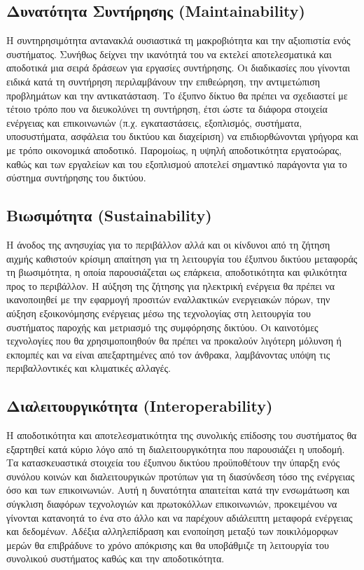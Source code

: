 \documentclass[12pt, a4paper, oneside]{report}
\begin{document}
\subsection*{Δυνατότητα Συντήρησης (Maintainability)}

Η συντηρησιμότητα αντανακλά ουσιαστικά τη μακροβιότητα και την αξιοπιστία ενός συστήματος. Συνήθως δείχνει την ικανότητά του να εκτελεί αποτελεσματικά και αποδοτικά μια σειρά δράσεων για εργασίες συντήρησης. Οι διαδικασίες που γίνονται ειδικά κατά τη συντήρηση περιλαμβάνουν την επιθεώρηση, την αντιμετώπιση προβλημάτων και την αντικατάσταση. Το έξυπνο δίκτυο θα πρέπει να σχεδιαστεί με τέτοιο τρόπο που να διευκολύνει τη συντήρηση, έτσι ώστε τα διάφορα στοιχεία ενέργειας και επικοινωνιών (π.χ. εγκαταστάσεις, εξοπλισμός, συστήματα, υποσυστήματα, ασφάλεια του δικτύου και διαχείριση) να επιδιορθώνονται γρήγορα και με τρόπο οικονομικά αποδοτικό. Παρομοίως, η υψηλή αποδοτικότητα εργατοώρας, καθώς και των εργαλείων και του εξοπλισμού αποτελεί σημαντικό παράγοντα για το σύστημα συντήρησης του δικτύου.

\subsection*{Βιωσιμότητα (Sustainability)}

Η άνοδος της ανησυχίας για το περιβάλλον αλλά και οι κίνδυνοι από τη ζήτηση αιχμής καθιστούν κρίσιμη απαίτηση για τη λειτουργία του έξυπνου δικτύου μεταφοράς τη βιωσιμότητα, η οποία παρουσιάζεται ως επάρκεια, αποδοτικότητα και φιλικότητα προς το περιβάλλον. Η αύξηση της ζήτησης για ηλεκτρική ενέργεια θα πρέπει να ικανοποιηθεί με την εφαρμογή προσιτών εναλλακτικών ενεργειακών πόρων, την αύξηση εξοικονόμησης ενέργειας μέσω της τεχνολογίας στη λειτουργία του συστήματος παροχής και μετριασμό της συμφόρησης δικτύου. Οι καινοτόμες τεχνολογίες που θα χρησιμοποιηθούν θα πρέπει να προκαλούν λιγότερη μόλυνση ή εκπομπές και να είναι απεξαρτημένες από τον άνθρακα, λαμβάνοντας υπόψη τις περιβαλλοντικές και κλιματικές αλλαγές.

\subsection*{Διαλειτουργικότητα (Interoperability)}

Η αποδοτικότητα και αποτελεσματικότητα της συνολικής επίδοσης του συστήματος θα εξαρτηθεί κατά κύριο λόγο από τη διαλειτουργικότητα που παρουσιάζει η υποδομή. Τα κατασκευαστικά στοιχεία του έξυπνου δικτύου προϋποθέτουν την ύπαρξη ενός συνόλου κοινών και διαλειτουργικών προτύπων για τη διασύνδεση τόσο της ενέργειας όσο και των επικοινωνιών. Αυτή η δυνατότητα απαιτείται κατά την ενσωμάτωση και σύγκλιση διαφόρων τεχνολογιών και πρωτοκόλλων επικοινωνιών, προκειμένου να γίνονται κατανοητά το ένα στο άλλο και να παρέχουν αδιάλειπτη μεταφορά ενέργειας και δεδομένων. Αδέξια αλληλεπίδραση και ενοποίηση μεταξύ των ποικιλόμορφων μερών θα επιβράδυνε το χρόνο απόκρισης και θα υποβάθμιζε τη λειτουργία του συνολικού συστήματος καθώς και την αποδοτικότητα.
\end{document}
